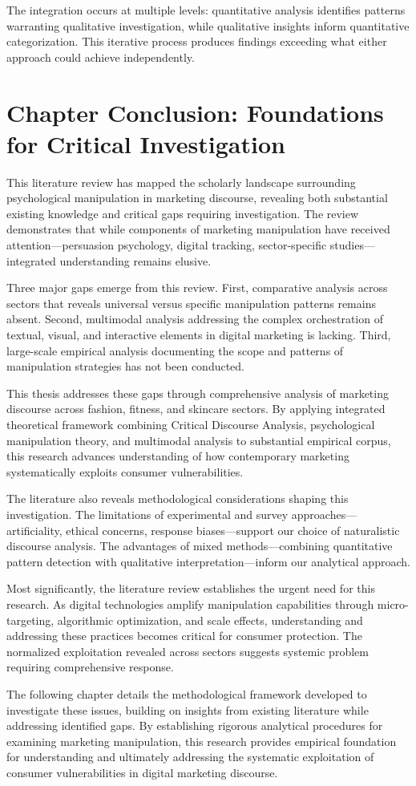 The integration occurs at multiple levels: quantitative analysis identifies patterns warranting qualitative investigation, while qualitative insights inform quantitative categorization. This iterative process produces findings exceeding what either approach could achieve independently.

\section{Chapter Conclusion: Foundations for Critical Investigation}
\label{sec:lit_conclusion}

This literature review has mapped the scholarly landscape surrounding psychological manipulation in marketing discourse, revealing both substantial existing knowledge and critical gaps requiring investigation. The review demonstrates that while components of marketing manipulation have received attention—persuasion psychology, digital tracking, sector-specific studies—integrated understanding remains elusive.

Three major gaps emerge from this review. First, comparative analysis across sectors that reveals universal versus specific manipulation patterns remains absent. Second, multimodal analysis addressing the complex orchestration of textual, visual, and interactive elements in digital marketing is lacking. Third, large-scale empirical analysis documenting the scope and patterns of manipulation strategies has not been conducted.

This thesis addresses these gaps through comprehensive analysis of marketing discourse across fashion, fitness, and skincare sectors. By applying integrated theoretical framework combining Critical Discourse Analysis, psychological manipulation theory, and multimodal analysis to substantial empirical corpus, this research advances understanding of how contemporary marketing systematically exploits consumer vulnerabilities.

The literature also reveals methodological considerations shaping this investigation. The limitations of experimental and survey approaches—artificiality, ethical concerns, response biases—support our choice of naturalistic discourse analysis. The advantages of mixed methods—combining quantitative pattern detection with qualitative interpretation—inform our analytical approach.

Most significantly, the literature review establishes the urgent need for this research. As digital technologies amplify manipulation capabilities through micro-targeting, algorithmic optimization, and scale effects, understanding and addressing these practices becomes critical for consumer protection. The normalized exploitation revealed across sectors suggests systemic problem requiring comprehensive response.

The following chapter details the methodological framework developed to investigate these issues, building on insights from existing literature while addressing identified gaps. By establishing rigorous analytical procedures for examining marketing manipulation, this research provides empirical foundation for understanding and ultimately addressing the systematic exploitation of consumer vulnerabilities in digital marketing discourse.